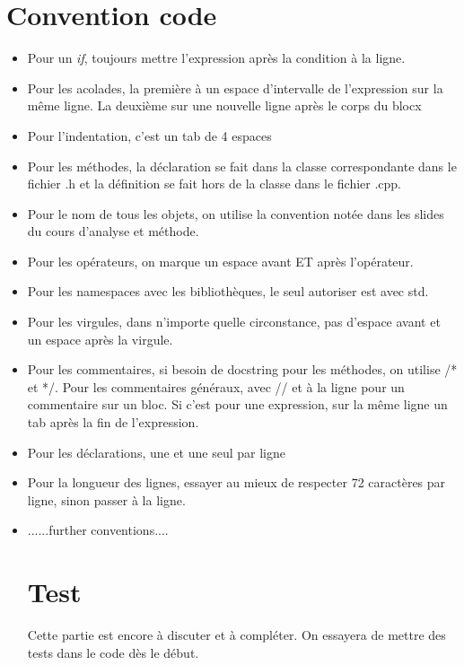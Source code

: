 \documentclass{article}
\begin{document}
\section{Convention code}
\begin{itemize}
\item Pour un \emph{if}, toujours mettre l'expression après la condition à la ligne.
\item Pour les acolades, la première à un espace d'intervalle de l'expression sur la même ligne. La deuxième sur une nouvelle ligne après le corps du blocx
\item Pour l'indentation, c'est un tab de 4 espaces
\item Pour les méthodes, la déclaration se fait dans la classe correspondante dans le fichier .h et la définition se fait hors de la classe dans le fichier .cpp.
\item Pour le nom de tous les objets, on utilise la convention notée dans les slides du cours d'analyse et méthode.
\item Pour les opérateurs, on marque un espace avant ET après l'opérateur.
\item Pour les namespaces avec les bibliothèques, le seul autoriser est avec std.
\item Pour les virgules, dans n'importe quelle circonstance, pas d'espace avant et un espace après la virgule.
\item Pour les commentaires, si besoin de docstring pour les méthodes, on utilise /* et */. Pour les commentaires généraux, avec // et à la ligne pour un commentaire sur un bloc. Si c'est pour une expression, sur la même ligne un tab après la fin de l'expression.
\item Pour les déclarations, une et une seul par ligne
\item Pour la longueur des lignes, essayer au mieux de respecter 72 caractères par ligne, sinon passer à la ligne.
\item ......further conventions....

\section{Test}
Cette partie est encore à discuter et à compléter. On essayera de mettre des tests dans le code dès le début.

\end{itemize}
\end{document}
